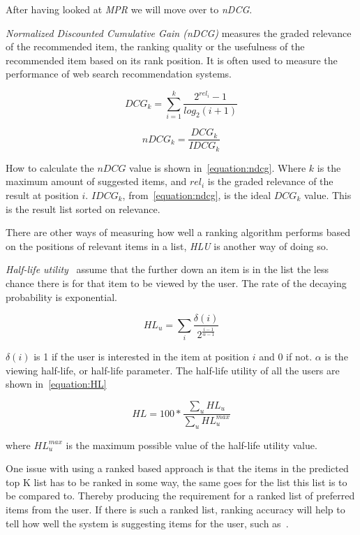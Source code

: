 After having looked at \emph{MPR} we will move over to \emph{nDCG}.

\textit{Normalized Discounted Cumulative Gain (nDCG)} measures the graded
relevance of the recommended item, the ranking quality or the usefulness of the
recommended item based on its rank position.  It is often used to measure the
performance of web search recommendation systems.

\begin{equation}
    DCG_k = \sum_{i=1}^{k}{\frac{2^{rel_i}-1}{log_2(i+1)}}
    \label{equation:dcg}
\end{equation}

\begin{equation}
    nDCG_k = \frac{DCG_k}{IDCG_k}
    \label{equation:ndcg}
\end{equation}

How to calculate the $nDCG$ value is shown in~\ref{equation:ndcg}.  Where $k$
is the maximum amount of suggested items, and $rel_i$ is the graded relevance
of the result at position $i$.  $IDCG_k$, from~\ref{equation:ndcg}, is the
ideal $DCG_k$ value.  This is the result list sorted on relevance.

There are other ways of measuring how well a ranking algorithm performs based on the positions of relevant items in a list, \emph{HLU} is another way of doing so.

\textit{Half-life utility}~\cite{Breese:1998:EAP:2074094.2074100} assume that
the further down an item is in the list the less chance there is for that item
to be viewed by the user.  The rate of the decaying probability is exponential.

\begin{equation}
	HL_u = \sum_{i}{\frac{\delta(i)}{2^{\frac{i-1}{\alpha-1}}}}
\end{equation}

$\delta(i)$ is 1 if the user is interested in the item at position $i$ and 0 if
not.  $\alpha$ is the viewing half-life, or half-life parameter.  The half-life
utility of all the users are shown in~\ref{equation:HL}

\begin{equation}
	HL = 100 * \frac{\sum_u{HL_u}}{\sum_u{HL_u^{max}}}
	\label{equation:HL}
\end{equation}

where $HL_u^{max}$ is the maximum possible value of the half-life utility
value.

One issue with using a ranked based approach is that the items in the predicted
top K list has to be ranked in some way, the same goes for the list this list
is to be compared to.  Thereby producing the requirement for a ranked list of
preferred items from the user.  If there is such a ranked list, ranking
accuracy will help to tell how well the system is suggesting items for the
user, such as~\cite{Yilmaz:2008:NRC:1390334.1390435}.

